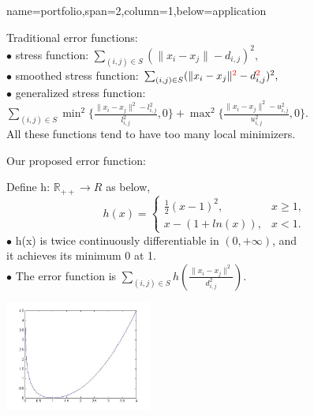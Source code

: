 \documentclass[a0paper,portrait]{baposter}
\newcommand{\red}{\color{red}}
\newcommand{\blue}{\color{blue}}
\begin{document}
\begin{poster}
{name=portfolio,span=2,column=1,below=application}{
{\blue Traditional error functions:}\\
\indent\quad $\bullet$ stress function: $\sum_{(i,j)\in S} (\|x_{i}-x_{j}\|-d_{i,j})^{2}, $\\
\indent\quad $\bullet$ smoothed stress function: $\sum_{(i,j)\in S} (\|x_{i}-x_{j}\|^{{\red 2}}-d_{i,j}^{{\red 2}})^{2}, $\\
\indent\quad $\bullet$ generalized stress function: $\sum_{(i,j)\in S} \min\nolimits^{2} \{\frac{\|x_{i}-x_{j}\|^{2}-l_{i,j}^2}{l_{i,j}^{2}},0\} + \max\nolimits^{2} \{\frac{\|x_{i}-x_{j}\|^{2}-u_{i,j}^2}{u_{i,j}^{2}},0\}.$\\
All these functions tend to have too many local minimizers.

{\blue Our proposed error function:}\\
\begin{minipage}{90mm}
Define h: $\mathbb{R}_{++}\rightarrow R$ as below,
\begin{displaymath}
  h(x) = \left\{ \begin{array}{ll}
                  \frac{1}{2}(x-1)^{2}, & x\geq 1, \\
                  x-(1+ln(x)),          & x<1.
                \end{array}   \right.
\end{displaymath}
$\bullet$ h(x) is twice continuously differentiable in $(0, +\infty)$, and \\
\indent\quad it achieves its minimum 0 at 1.\\
$\bullet$ The error function is {\red $\sum_{(i,j)\in S} h(\frac{\|x_{i}-x_{j}\|^2}{d_{i,j}^2})$}.
\end{minipage}
\begin{minipage}{50mm}
\includegraphics[width=\linewidth,height=36mm]{huke.jpg}
\end{minipage}
}
\end{poster}
\end{document}
